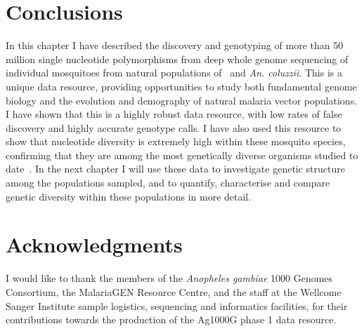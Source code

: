 \documentclass[a4paper,11pt,abstracton,hidelinks]{scrartcl}
\begin{document}
\section{Conclusions}\label{sec:conclusions}


In this chapter I have described the discovery and genotyping of more than 50 million single nucleotide polymorphisms from deep whole genome sequencing of individual mosquitoes from natural populations of \agam\ and \textit{An. coluzzii}.
%
This is a unique data resource, providing opportunities to study both fundamental genome biology and the evolution and demography of natural malaria vector populations.
%
I have shown that this is a highly robust data resource, with low rates of false discovery and highly accurate genotype calls.
%
I have also used this resource to show that nucleotide diversity is extremely high within these mosquito species, confirming that they are among the most genetically diverse organisms studied to date~\parencite{Leffler2012}.
%
In the next chapter I will use these data to investigate genetic structure among the populations sampled, and to quantify, characterise and compare genetic diversity within these populations in more detail.


\section{Acknowledgments}\label{sec:acknowledgments}


I would like to thank the members of the \textit{Anopheles gambiae} 1000 Genomes Consortium, the MalariaGEN Resource Centre, and the staff at the Wellcome Sanger Institute sample logistics, sequencing and informatics facilities, for their contributions towards the production of the Ag1000G phase 1 data resource.


\printbibliography


\clearpage
\beginsupplement
\end{document}
